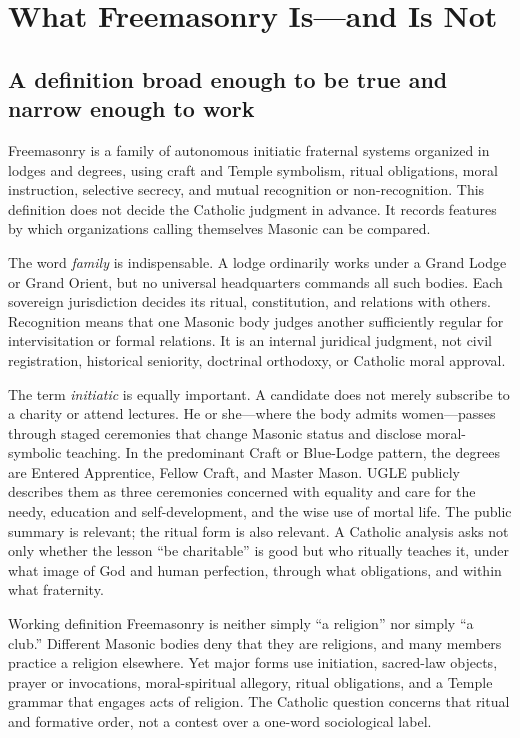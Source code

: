 \section{What Freemasonry Is---and Is Not}

\subsection{A definition broad enough to be true and narrow enough to work}

Freemasonry is a family of autonomous initiatic fraternal systems organized in lodges and degrees, using craft and Temple symbolism, ritual obligations, moral instruction, selective secrecy, and mutual recognition or non-recognition. This definition does not decide the Catholic judgment in advance. It records features by which organizations calling themselves Masonic can be compared.

The word \emph{family} is indispensable. A lodge ordinarily works under a Grand Lodge or Grand Orient, but no universal headquarters commands all such bodies. Each sovereign jurisdiction decides its ritual, constitution, and relations with others. Recognition means that one Masonic body judges another sufficiently regular for intervisitation or formal relations. It is an internal juridical judgment, not civil registration, historical seniority, doctrinal orthodoxy, or Catholic moral approval.

The term \emph{initiatic} is equally important. A candidate does not merely subscribe to a charity or attend lectures. He or she---where the body admits women---passes through staged ceremonies that change Masonic status and disclose moral-symbolic teaching. In the predominant Craft or Blue-Lodge pattern, the degrees are Entered Apprentice, Fellow Craft, and Master Mason. UGLE publicly describes them as three ceremonies concerned with equality and care for the needy, education and self-development, and the wise use of mortal life. The public summary is relevant; the ritual form is also relevant. A Catholic analysis asks not only whether the lesson “be charitable” is good but who ritually teaches it, under what image of God and human perfection, through what obligations, and within what fraternity.

\begin{studybox}{Working definition}
Freemasonry is neither simply “a religion” nor simply “a club.” Different Masonic bodies deny that they are religions, and many members practice a religion elsewhere. Yet major forms use initiation, sacred-law objects, prayer or invocations, moral-spiritual allegory, ritual obligations, and a Temple grammar that engages acts of religion. The Catholic question concerns that ritual and formative order, not a contest over a one-word sociological label.
\end{studybox}

